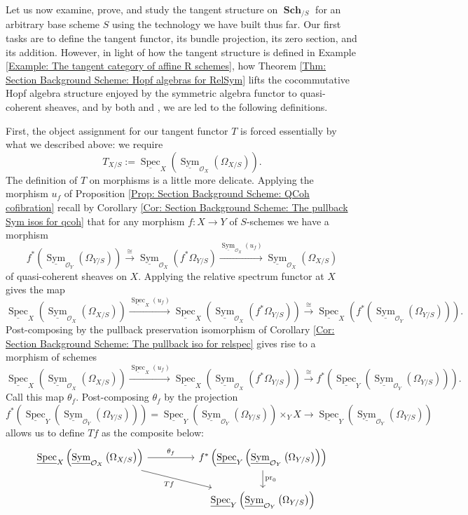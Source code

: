 \documentclass{amsart}
\theoremstyle{definition}
\DeclareMathOperator{\Ocal}{\mathcal{O}}
\DeclareMathOperator{\sym}{Sym}
\DeclareMathOperator{\Spec}{Spec}
\newcommand{\RelSpec}[1]{\underline{\Spec}_{#1}}
\newcommand{\RelSym}[1]{\underline{\sym}_{{#1}}}
\DeclareMathOperator{\Sch}{\mathbf{Sch}}
\DeclareMathOperator{\pr}{pr}
\newcommand{\Kah}[2]{\Omega_{{#1}/{#2}}}
\numberwithin{equation}{subsection}
\begin{document}
Let us  now examine, prove, and study the tangent structure on $\Sch_{/S}$ for an arbitrary base scheme $S$ using the technology we have built thus far. Our first tasks are to define the tangent functor, its bundle projection, its zero section, and its addition. However, in light of how the tangent structure is defined in Example \ref{Example: The tangent category of affine R schemes}, how Theorem \ref{Thm: Section Background Scheme: Hopf algebras for RelSym} lifts the cocommutative Hopf algebra structure enjoyed by the symmetric algebra functor to quasi-coherent sheaves, and by both \cite[Line 16.5.12.1]{EGA44} and \cite[Theorem 4.27]{GeoffJSDiffBunComAlg}, we are led to the following definitions.

First, the object assignment for our tangent functor $T$ is forced essentially by what we described above: we require
\[
T_{X/S} := \RelSpec{X}\left(\RelSym{\Ocal_X}\left(\Kah{X}{S}\right)\right).
\]
The definition of $T$ on morphisms is a little more delicate. Applying the morphism $u_f$ of Proposition \ref{Prop: Section Background Scheme: QCoh cofibration} recall by Corollary \ref{Cor: Section Background Scheme: The pullback Sym isos for qcoh} that for any morphism $f:X \to Y$ of $S$-schemes we have a morphism
\[
f^{\ast}\left(\RelSym{\Ocal_Y}\left(\Kah{Y}{S}\right)\right) \xrightarrow{\cong} \RelSym{\Ocal_X}\left(f^{\ast}\Kah{Y}{S}\right) \xrightarrow{\RelSym{\Ocal_X}(u_f)} \RelSym{\Ocal_X}\left(\Kah{X}{S}\right)
\]
of quasi-coherent sheaves on $X$. Applying the relative spectrum functor at $X$ gives the map
\[
\RelSpec{X}\left(\RelSym{\Ocal_X}\left(\Kah{X}{S}\right)\right) \xrightarrow{\RelSpec{X}(u_f)} \RelSpec{X}\left(\RelSym{\Ocal_X}\left(f^{\ast}\Kah{Y}{S}\right)\right) \xrightarrow{\cong} \RelSpec{X}\left(f^{\ast}\left(\RelSym{\Ocal_Y}\left(\Kah{Y}{S}\right)\right)\right).
\]
Post-composing by the pullback preservation isomorphism of Corollary \ref{Cor: Section Background Scheme: The pullback iso for relspec} gives rise to a morphism of schemes
\[
\RelSpec{X}\left(\RelSym{\Ocal_X}\left(\Kah{X}{S}\right)\right) \xrightarrow{\RelSpec{X}(u_f)} \RelSpec{X}\left(\RelSym{\Ocal_X}\left(f^{\ast}\Kah{Y}{S}\right)\right) \xrightarrow{\cong} f^{\ast}\left(\RelSpec{Y}\left(\RelSym{\Ocal_Y}\left(\Kah{Y}{S}\right)\right)\right).
\]
Call this map $\theta_f$. Post-composing $\theta_f$ by the projection
\[
f^{\ast}\left(\RelSpec{Y}\left(\RelSym{\Ocal_Y}\left(\Kah{Y}{S}\right)\right)\right) = \RelSpec{Y}\left(\RelSym{\Ocal_Y}\left(\Kah{Y}{S}\right)\right) \times_Y X \longrightarrow \RelSpec{Y}\left(\RelSym{\Ocal_Y}\left(\Kah{Y}{S}\right)\right)
\]
allows us to define $Tf$ as the composite below:
\begin{equation}\label{Eqn: Section Tangent: Tangent Functor Assignment on Morphisms}
	\begin{tikzcd}
	\RelSpec{X}\left(\RelSym{\Ocal_X}\left(\Kah{X}{S}\right)\right) \ar[rr]{}{\theta_f} \ar[drr, swap]{}{Tf} & & f^{\ast}\left(\RelSpec{Y}\left(\RelSym{\Ocal_Y}\left(\Kah{Y}{S}\right)\right)\right) \ar[d]{}{\pr_0} \\
	 & & \RelSpec{Y}\left(\RelSym{\Ocal_Y}\left(\Kah{Y}{S}\right)\right)
	\end{tikzcd}
\end{equation}
\end{document}
